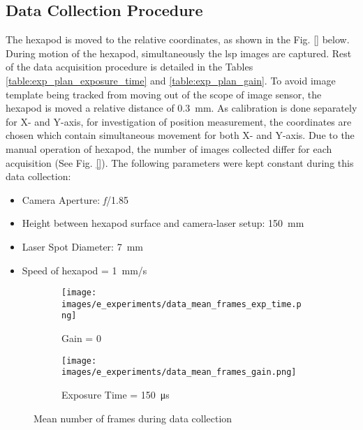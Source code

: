     \subsection*{Data Collection Procedure}\label{subsection:data_collection_procedure}
    The hexapod is moved to the relative coordinates, as shown in the Fig. \ref{} below. During motion of the hexapod, simultaneously the \gls{lsp} images are captured. Rest of the data acquisition procedure is detailed in the Tables \ref{table:exp_plan_exposure_time} and \ref{table:exp_plan_gain}. To avoid image template being tracked from moving out of the scope of image sensor, the hexapod is moved a relative distance of \SI{0.3}{\milli\meter}. As calibration is done separately for X- and Y-axis, for investigation of position measurement, the coordinates are chosen which contain simultaneous movement for both X- and Y-axis. Due to the manual operation of hexapod, the number of images collected differ for each acquisition (See Fig. \ref{}). The following parameters were kept constant during this data collection:
        \begin{itemize}
            \item Camera Aperture: \emph{f}/1.85
            \item Height between hexapod surface and camera-laser setup: \SI{150}{\milli\meter}
            \item Laser Spot Diameter: \SI{7}{\milli\meter}
            \item Speed of hexapod = \SI{1}{\milli\meter/\second}
        \end{itemize}

        \begin{figure}[ht]
            \centering
            \begin{subfigure}{0.55\textwidth}
                \texttt{[image: images/e\_experiments/data\_mean\_frames\_exp\_time.png]}
                \caption{Gain = 0}
                \label{subfig:data_mean_frames_exp_time.png}
            \end{subfigure}

            \begin{subfigure}{0.55\textwidth}
                \texttt{[image: images/e\_experiments/data\_mean\_frames\_gain.png]}
                \caption{Exposure Time = \SI{150}{\micro\second}}
                \label{subfig:data_mean_frames_exp_time.png}
            \end{subfigure}
            \caption{Mean number of frames during data collection}
            \label{fig:mean_frames_data_collection}
        \end{figure}


